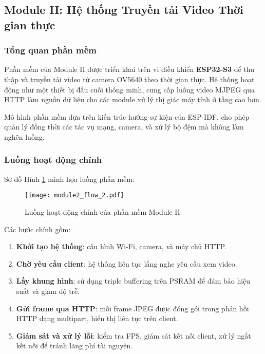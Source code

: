 \subsection{Module II: Hệ thống Truyền tải Video Thời gian thực}
\label{sec:module_ii_software}

\subsubsection{Tổng quan phần mềm}
Phần mềm của Module II được triển khai trên vi điều khiển \textbf{ESP32-S3} để thu thập và truyền tải video từ camera OV5640 theo thời gian thực. Hệ thống hoạt động như một thiết bị đầu cuối thông minh, cung cấp luồng video MJPEG qua HTTP làm nguồn dữ liệu cho các module xử lý thị giác máy tính ở tầng cao hơn.  

Mô hình phần mềm dựa trên kiến trúc hướng sự kiện của ESP-IDF, cho phép quản lý đồng thời các tác vụ mạng, camera, và xử lý bộ đệm mà không làm nghẽn luồng.

\subsubsection{Luồng hoạt động chính}
Sơ đồ Hình \ref{fig:sw_architecture_flow} minh họa luồng phần mềm:

\begin{figure}[H]
    \centering
    \texttt{[image: module2\_flow\_2.pdf]}
    \caption{Luồng hoạt động chính của phần mềm Module II}
    \label{fig:sw_architecture_flow}
\end{figure}

Các bước chính gồm:

\begin{enumerate}
    \item \textbf{Khởi tạo hệ thống}: cấu hình Wi-Fi, camera, và máy chủ HTTP.
    \item \textbf{Chờ yêu cầu client}: hệ thống liên tục lắng nghe yêu cầu xem video.
    \item \textbf{Lấy khung hình}: sử dụng triple buffering trên PSRAM để đảm bảo hiệu suất và giảm độ trễ.
    \item \textbf{Gửi frame qua HTTP}: mỗi frame JPEG được đóng gói trong phản hồi HTTP dạng multipart, hiển thị liên tục trên client.
    \item \textbf{Giám sát và xử lý lỗi}: kiểm tra FPS, giám sát kết nối client, xử lý ngắt kết nối để tránh lãng phí tài nguyên.
\end{enumerate}

